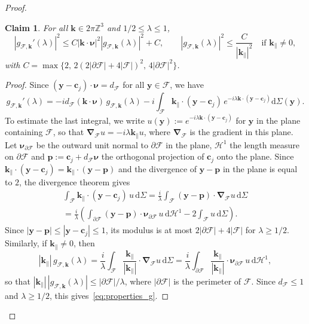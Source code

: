 \documentclass[final,reqno]{amsart}
\newtheorem*{claim}{Claim}
\theoremstyle{remark}
\renewcommand{\le}{\leqslant}
\renewcommand{\ge}{\geqslant}
\newcommand{\ZZ}{\mathbb{Z}}
\newcommand{\grad}{\bm{\nabla}}
\newcommand{\dd}{\mathrm{d}}
\begin{document}
\begin{proof}
\begin{claim}
For all $\mathbf{k}\in2\pi\ZZ^3$ and $1/2\le\lambda\le1$,
\begin{equation}\label{eq:properties_g}
|g_{\mathcal{F},\mathbf{k}}'(\lambda)|^2\le C|\mathbf{k}\cdot \bm{\nu}|^2|g_{\mathcal{F},\mathbf{k}}(\lambda)|^2+C,\qquad |g_{\mathcal{F},\mathbf{k}}(\lambda)|^2\le\frac{C}{|\mathbf{k}_\parallel|^2}\quad\text{if }\mathbf{k}_\parallel\neq0,
\end{equation}
with $C=\max\{2,\,2(2|\partial \mathcal{F}|+4|\mathcal{F}|)^2,\,4|\partial \mathcal{F}|^2\}$.
\end{claim}

\begin{proof}
Since $(\mathbf{y}-\mathbf{c}_j)\cdot \bm{\nu}=d_{\mathcal{F}}$ for all $\mathbf{y}\in \mathcal{F}$, we have
$$
g_{\mathcal{F},\mathbf{k}}'(\lambda)=-id_{\mathcal{F}}(\mathbf{k}\cdot \bm{\nu})\,g_{\mathcal{F},\mathbf{k}}(\lambda)-i\int_{\mathcal{F}}\mathbf{k}_\parallel\cdot(\mathbf{y}-\mathbf{c}_j)\,e^{-i\lambda \mathbf{k}\cdot(\mathbf{y}-\mathbf{c}_j)}\dd\Sigma(\mathbf{y}).
$$
To estimate the last integral, we write $u(\mathbf{y}):=e^{-i\lambda \mathbf{k}\cdot(\mathbf{y}-\mathbf{c}_j)}$ for $\mathbf{y}$ in the plane containing $\mathcal{F}$, so that $\grad_{\mathcal{F}} u=-i\lambda\mathbf{k}_\parallel u$, where $\grad_{\mathcal{F}}$ is the gradient in this plane. Let $\bm{\nu}_{\partial \mathcal{F}}$ be the outward unit normal to $\partial \mathcal{F}$ in the plane, $\mathcal{H}^1$ the length measure on $\partial \mathcal{F}$ and $\mathbf{p}:=\mathbf{c}_j+d_{\mathcal{F}}\bm{\nu}$ the orthogonal projection of $\mathbf{c}_j$ onto the plane. Since $\mathbf{k}_\parallel\cdot(\mathbf{y}-\mathbf{c}_j)=\mathbf{k}_\parallel\cdot(\mathbf{y}-\mathbf{p})$ and the divergence of $\mathbf{y}-\mathbf{p}$ in the plane is equal to $2$, the divergence theorem gives
\begin{multline*}
\int_{\mathcal{F}}\mathbf{k}_\parallel\cdot(\mathbf{y}-\mathbf{c}_j)\,u\,\dd\Sigma=\frac{i}{\lambda}\int_{\mathcal{F}}(\mathbf{y}-\mathbf{p})\cdot\grad_{\mathcal{F}} u\,\dd\Sigma\\
=\frac{i}{\lambda}\left(\int_{\partial \mathcal{F}}(\mathbf{y}-\mathbf{p})\cdot\bm{\nu}_{\partial \mathcal{F}}\,u\,\dd\mathcal{H}^1-2\int_{\mathcal{F}} u\,\dd\Sigma\right).
\end{multline*}
Since $|\mathbf{y}-\mathbf{p}|\le|\mathbf{y}-\mathbf{c}_j|\le1$, its modulus is at most $2|\partial \mathcal{F}|+4|\mathcal{F}|$ for $\lambda\ge1/2$. Similarly, if $\mathbf{k}_\parallel\neq0$, then
$$
|\mathbf{k}_\parallel|\,g_{\mathcal{F},\mathbf{k}}(\lambda)=\frac{i}{\lambda}\int_{\mathcal{F}}\frac{\mathbf{k}_\parallel}{|\mathbf{k}_\parallel|}\cdot\grad_{\mathcal{F}} u\,\dd\Sigma=\frac{i}{\lambda}\int_{\partial \mathcal{F}}\frac{\mathbf{k}_\parallel}{|\mathbf{k}_\parallel|}\cdot\bm{\nu}_{\partial \mathcal{F}}\,u\,\dd\mathcal{H}^1,
$$
so that $|\mathbf{k}_\parallel|\,|g_{\mathcal{F},\mathbf{k}}(\lambda)|\le|\partial \mathcal{F}|/\lambda$, where $|\partial \mathcal{F}|$ is the perimeter of $\mathcal{F}$. Since $d_{\mathcal{F}}\le1$ and $\lambda\ge1/2$, this gives~\cref{eq:properties_g}.
\end{proof}


\end{proof}
\end{document}
